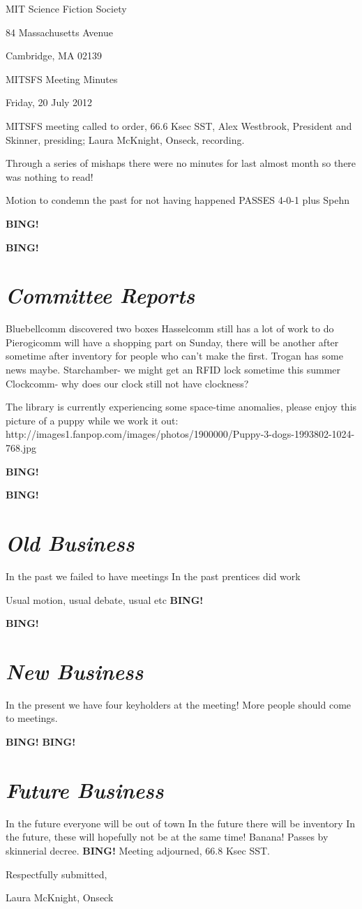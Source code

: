 \documentclass[10pt]{article}
\newcommand{\bing}{{\bf BING!} }
\newcommand{\goto}[1]{\bing \vskip 12pt \section*{{\em{#1}}}}
\newcommand{\ps}{ plus Spehn\xspace}
\newcommand{\skinner}{Alex Westbrook, President and Skinner}
\newcommand{\onseck}{Laura McKnight, Onseck}
\newcommand{\meetingdate}{Friday, 20 July 2012}
\begin{document}
\begin{center}

MIT Science Fiction Society

84 Massachusetts Avenue

Cambridge, MA 02139

\vspace{12pt}

MITSFS Meeting Minutes

\meetingdate

\end{center}

\vspace{18pt}

\setlength{\parskip}{6pt}

\noindent
MITSFS meeting called to order, 66.6 Ksec SST,
\skinner, presiding; \onseck, recording.

Through a series of mishaps there were no minutes for last almost month so there was nothing to read!

Motion to condemn the past for not having happened PASSES 4-0-1\ps

\bing

\goto{Committee Reports}
Bluebellcomm discovered two boxes
Hasselcomm still has a lot of work to do
Pierogicomm will have a shopping part on Sunday, there will be another after sometime after inventory for people who can't make the first.
Trogan has some news maybe.
Starchamber- we might get an RFID lock sometime this summer
Clockcomm- why does our clock still not have clockness?

The library is currently experiencing some space-time anomalies, please enjoy this picture of a puppy while we work it out: http://images1.fanpop.com/images/photos/1900000/Puppy-3-dogs-1993802-1024-768.jpg

\bing


\goto{Old Business}
In the past we failed to have meetings
In the past prentices did work

Usual motion, usual debate, usual etc
\bing

\goto{New Business}
In the present we have four keyholders at the meeting! More people should come to meetings.

\bing
\goto{Future Business}
In the future everyone will be out of town
In the future there will be inventory
In the future, these will hopefully not be at the same time!
Banana! Passes by skinnerial decree.
\bing
\noindent
Meeting adjourned, 66.8 Ksec SST.

\vspace{18pt}

\centerline{Respectfully submitted,}
\centerline{\onseck}
\end{document}
